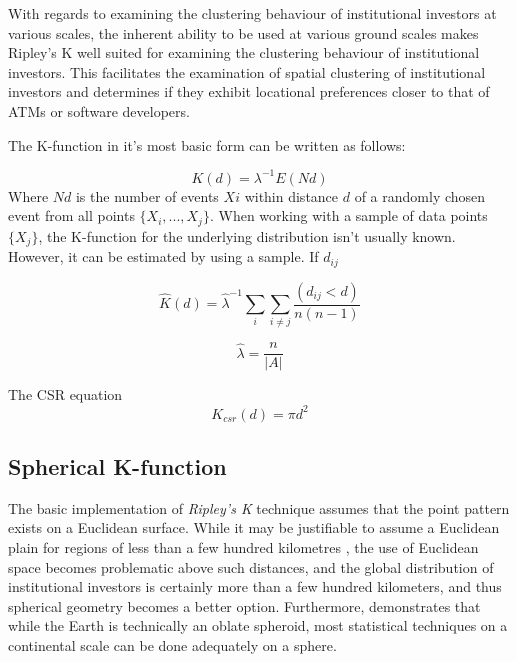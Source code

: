 With regards to examining the clustering behaviour of institutional investors at various scales, the inherent ability to be used at various ground scales makes Ripley's K well suited for examining the clustering behaviour of institutional investors.  This facilitates the examination  of spatial clustering of institutional investors  and determines if they exhibit locational preferences closer to that of ATMs or software developers. 

The K-function in it's most basic form can be written as follows:  

\begin{equation}
K(d) = \lambda^{-1}E(Nd)
\end{equation}
Where $Nd$ is the number of events $Xi$ within distance $d$ of a randomly chosen event from all points $\{X_{i},...,X_{j} \}$.  When working with a sample of data points $\{ X_{j} \}$, the K-function for the underlying distribution isn't usually known.  However, it can be estimated by using a sample.  If $d_{ij}$ 

\begin{equation}
\hat{K}(d) = \hat{\lambda}^{-1}\sum_{i}\sum_{i \neq j}\dfrac{(d_{ij} < d)}{n(n-1)}
\end{equation}

\begin{equation}
    \hat{\lambda} = \dfrac{n}{|A|}
\end{equation}

The CSR equation
\begin{equation}
    K_{csr}(d) = \pi d^{2}
    \label{eq:csr}
\end{equation}

\cite{brunsdon2015introduction}

\subsection{Spherical K-function}

The basic implementation of \textit{Ripley's K} technique assumes that the point pattern exists on a Euclidean surface.  While it may be justifiable to assume a Euclidean plain for regions of less than a few hundred kilometres \citep{HeatherJ.Lynch2008,wilschut2015spatial},  the use of Euclidean space becomes problematic above such distances, and the global distribution of institutional investors is certainly more than a few hundred kilometers, and thus spherical geometry becomes a better option. Furthermore, \cite{Tobler2002} demonstrates that while the Earth is technically an oblate spheroid, most statistical techniques on a continental scale can be done adequately on a sphere.  


